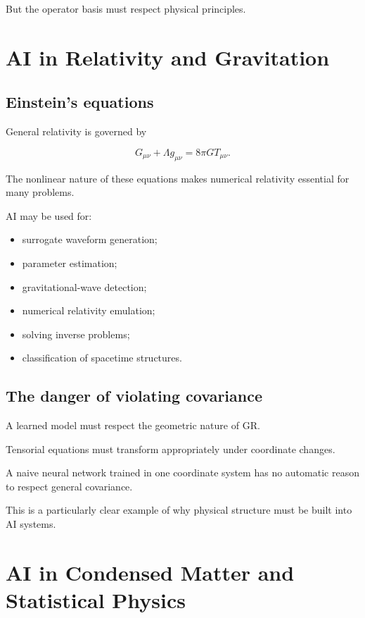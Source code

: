 \documentclass[11pt,a4paper,oneside]{book}
\begin{document}
But the operator basis must respect physical principles.

\chapter{AI in Relativity and Gravitation}

\section{Einstein's equations}

General relativity is governed by

\begin{equation}
G_{\mu\nu}
+
\Lambda g_{\mu\nu}
=
8\pi G T_{\mu\nu}.
\end{equation}

The nonlinear nature of these equations makes numerical relativity essential
for many problems.

AI may be used for:

\begin{itemize}
\item surrogate waveform generation;
\item parameter estimation;
\item gravitational-wave detection;
\item numerical relativity emulation;
\item solving inverse problems;
\item classification of spacetime structures.
\end{itemize}

\section{The danger of violating covariance}

A learned model must respect the geometric nature of GR.

Tensorial equations must transform appropriately under coordinate changes.

A naive neural network trained in one coordinate system has no automatic reason
to respect general covariance.

This is a particularly clear example of why physical structure must be built
into AI systems.

\chapter{AI in Condensed Matter and Statistical Physics}
\end{document}
